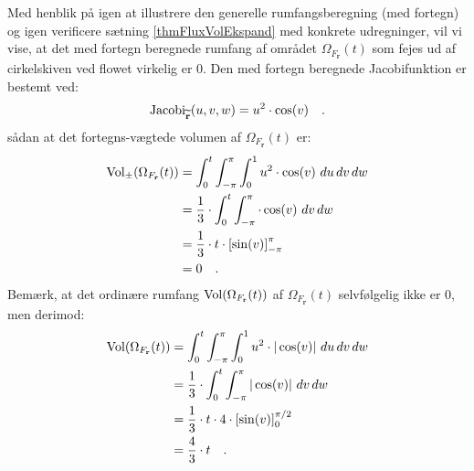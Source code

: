 \begin{example}
Med henblik på igen at illustrere den generelle rumfangsberegning (med fortegn) og igen verificere sætning \ref{thmFluxVolEkspand} med konkrete udregninger, vil vi vise, at det med fortegn beregnede rumfang af området $\Omega_{F_{\mathbf{r}}}(t)$  som fejes ud af cirkelskiven ved flowet virkelig er $0$. Den med fortegn beregnede Jacobifunktion er bestemt ved:
\begin{equation}
\operatorname{Jacobi}_{\widetilde{\mathbf{r}}}(u,v,w) = u^{2}\cdot \cos(v) \quad .
\end{equation}
sådan at det fortegns-vægtede volumen af $\Omega_{F_{\mathbf{r}}}(t)$ er:
\begin{equation}
\begin{aligned}
\operatorname{Vol}_{\pm}(\Omega_{F_{\mathbf{r}}}(t)) &= \int_{0}^{t} \int_{-\pi}^{\pi} \int_{0}^{1} u^{2}\cdot \cos(v) \, \, du \, dv \, dw \\
&= \frac{1}{3}\cdot \int_{0}^{t} \int_{-\pi}^{\pi}\cdot \cos(v) \, \, dv \, dw \\
&= \frac{1}{3}\cdot t \cdot \left[ \sin(v)\right]_{-\pi}^{\pi} \\
&= 0 \quad .
\end{aligned}
\end{equation}
Bemærk, at det ordinære rumfang $\operatorname{Vol}(\Omega_{F_{\mathbf{r}}}(t))$   af $\Omega_{F_{\mathbf{r}}}(t)$ selvfølgelig ikke er $0$, men derimod:
\begin{equation}
\begin{aligned}
\operatorname{Vol}(\Omega_{F_{\mathbf{r}}}(t)) &= \int_{0}^{t} \int_{-\pi}^{\pi} \int_{0}^{1} u^{2}\cdot |\cos(v)| \, \, du \, dv \, dw \\
&= \frac{1}{3}\cdot \int_{0}^{t} \int_{-\pi}^{\pi} |\cos(v)| \, \, dv \, dw \\
&= \frac{1}{3}\cdot t \cdot 4 \cdot \left[ \sin(v)\right]_{0}^{\pi/2} \\
&= \frac{4}{3}\cdot t \quad .
\end{aligned}
\end{equation}
\end{example}

